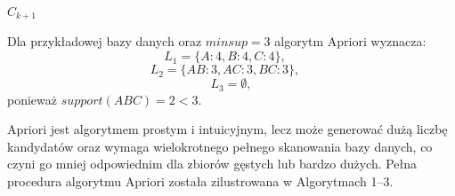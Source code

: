\begin{algorithm}[!htb]
\LinesNumbered
{}


\BlankLine

\caption{\textbf{Procedure} ComputeSupport$(C_k, D)$ — wywoływane przez algorytm Apriori}
\label{proc:compute_support}
\end{algorithm}


\begin{algorithm}[!htb]
\LinesNumbered
{}

\BlankLine


\Return $C_{k+1}$
\caption{\textbf{Procedure} ExtendPrefixTree$(C_k)$ — wywoływane przez algorytym Apriori}
\label{proc:extend_prefix}
\end{algorithm}

Dla przykładowej bazy danych oraz $minsup = 3$ algorytm Apriori wyznacza:
\begin{equation}
L_1 = \{A:4, B:4, C:4\},\quad
\end{equation}
\begin{equation}
L_2 = \{AB:3, AC:3, BC:3\},\quad
\end{equation}
\begin{equation}
L_3 = \emptyset,
\end{equation}
ponieważ $support(ABC) = 2 < 3$.

Apriori jest algorytmem prostym i intuicyjnym, lecz może generować dużą liczbę kandydatów oraz wymaga wielokrotnego pełnego skanowania bazy danych, co czyni go mniej odpowiednim dla zbiorów gęstych lub bardzo dużych. Pełna procedura algorytmu Apriori została zilustrowana w Algorytmach 1–3.


